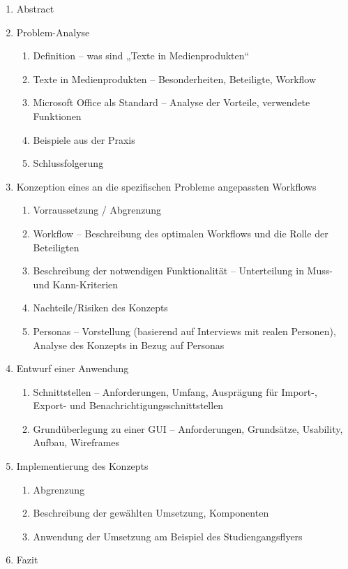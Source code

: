 \documentclass[11pt,a4paper]{article}
\begin{document}
\begin{enumerate}
\item Abstract
\item Problem-Analyse
\begin{enumerate}
\item Definition -- was sind „Texte in Medienprodukten“
\item Texte in Medienprodukten -- Besonderheiten, Beteiligte, Workflow
\item Microsoft Office als Standard -- Analyse der Vorteile, verwendete Funktionen
\item Beispiele aus der Praxis
\item Schlussfolgerung
\end{enumerate}
\item Konzeption eines an die spezifischen Probleme angepassten Workflows
\begin{enumerate}
\item Vorraussetzung / Abgrenzung
\item Workflow -- Beschreibung des optimalen Workflows und die Rolle der Beteiligten
\item Beschreibung der notwendigen Funktionalität -- Unterteilung in Muss- und Kann-Kriterien
\item Nachteile/Risiken des Konzepts
\item Personas -- Vorstellung (basierend auf Interviews mit realen Personen), Analyse des Konzepts in Bezug auf Personas
\end{enumerate}

\item Entwurf einer Anwendung
\begin{enumerate}
\item Schnittstellen -- Anforderungen, Umfang, Ausprägung für Import-, Export- und Benachrichtigungsschnittstellen
\item Grundüberlegung zu einer GUI -- Anforderungen, Grundsätze, Usability, Aufbau, Wireframes
\end{enumerate}

\item Implementierung des Konzepts
\begin{enumerate}
\item Abgrenzung
\item Beschreibung der gewählten Umsetzung, Komponenten
\item Anwendung der Umsetzung am Beispiel des Studiengangsflyers
\end{enumerate}

\item Fazit
\end{enumerate}
\end{document}
